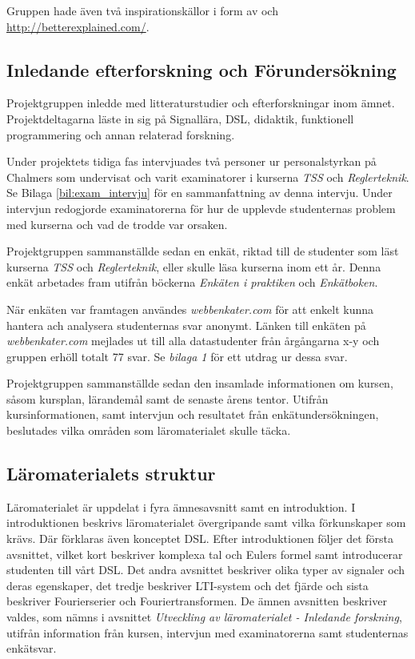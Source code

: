 \documentclass[]{article}
\begin{document}
Gruppen hade även två inspirationskällor i form av \cite{learnyouahaskell} och \url{http://betterexplained.com/}.


\subsection{Inledande efterforskning och Förundersökning}

Projektgruppen inledde med litteraturstudier och efterforskningar inom ämnet. Projektdeltagarna läste in sig på
Signallära, DSL, didaktik, funktionell programmering och annan relaterad forskning.

Under projektets tidiga fas intervjuades två personer ur personalstyrkan på Chalmers
som undervisat och varit examinatorer i kurserna \textit{TSS} och
\textit{Reglerteknik}. Se Bilaga \ref{bil:exam_intervju} för en sammanfattning
av denna intervju. Under intervjun redogjorde examinatorerna för hur de upplevde
studenternas problem med kurserna och vad de trodde var orsaken.

Projektgruppen sammanställde sedan en enkät, riktad till de studenter som läst kurserna \textit{TSS} och
\textit{Reglerteknik}, eller skulle läsa kurserna inom ett år. Denna enkät arbetades fram utifrån böckerna
\textit{Enkäten i praktiken} och \textit{Enkätboken}.

När enkäten var framtagen användes \textit{webbenkater.com} för att enkelt kunna hantera ach analysera studenternas svar
anonymt. Länken till enkäten på \textit{webbenkater.com} mejlades ut till alla datastudenter från årgångarna x-y och
gruppen erhöll totalt 77 svar.  Se \textit{bilaga 1} för ett utdrag ur dessa svar.

Projektgruppen sammanställde sedan den insamlade informationen om kursen, såsom kursplan, lärandemål samt de senaste
årens tentor. Utifrån kursinformationen, samt intervjun och resultatet från enkätundersökningen, beslutades vilka
områden som läromaterialet skulle täcka.


\subsection{Läromaterialets struktur}

Läromaterialet är uppdelat i fyra ämnesavsnitt samt en introduktion. I introduktionen beskrivs läromaterialet
övergripande samt vilka förkunskaper som krävs. Där förklaras även konceptet DSL. Efter introduktionen följer det
första avsnittet, vilket kort beskriver komplexa tal och Eulers formel samt introducerar studenten till vårt DSL. Det
andra avsnittet beskriver olika typer av signaler och deras egenskaper, det tredje beskriver LTI-system och det fjärde
och sista beskriver Fourierserier och Fouriertransformen. De ämnen avsnitten beskriver valdes, som nämns i avsnittet
\textit{Utveckling av läromaterialet - Inledande forskning}, utifrån information från kursen, intervjun med
examinatorerna samt studenternas enkätsvar.
\end{document}

